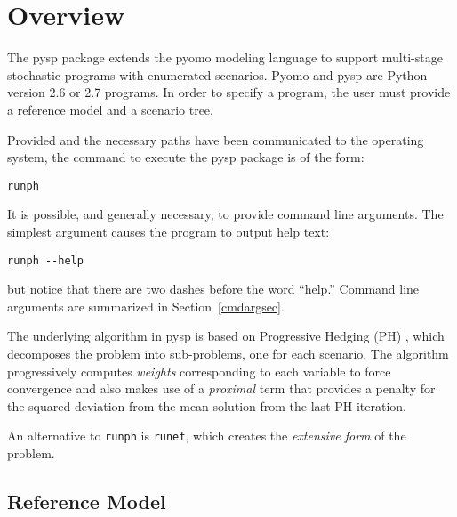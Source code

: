 \def\Argmax{\mathop{\rm argmax}}
\newcommand{\xBar}{\Vector{\overline{x}}}
\newcommand{\Bar}[1]{\overline{#1}}
\newcommand{\Prl}{\mbox{Pr}(\ell)}

\newcommand{\Vector}[1]{\mbox{{\boldmath $#1$}}}
\newcommand{\Matrix}[1]{\mbox{{\boldmath $#1$}}}
\newcommand{\VectLen}[1]{\mid\Vector{#1}\mid}
\newcommand{\Rint}[1]{\int_{#1}^{\infty}}
\newcommand{\Size}[1]{\mid #1 \mid}
\newcommand{\Floor}[1]{\lfloor #1 \rfloor}
\newcommand{\Ceil}[1]{\left\lceil #1 \right\rceil}

\section{Overview}

The pysp package extends the pyomo modeling language to support multi-stage
stochastic programs with enumerated scenarios. Pyomo and pysp are Python version
2.6 or 2.7 programs. In order to specify a program, the user must provide a reference
model and a scenario tree.

Provided and the necessary paths have been communicated to the operating system,
the command to execute the pysp package is of the form:

\begin{verbatim}
runph
\end{verbatim}

It is possible, and generally necessary, to provide command line arguments. The
simplest argument causes the program to output help text:

\begin{verbatim}
runph --help
\end{verbatim}

but notice that there are two dashes before the word ``help.'' Command line
arguments are summarized in Section~\ref{cmdargsec}.

The underlying algorithm in pysp is based on Progressive Hedging (PH)
\cite{RockafellarWets}, which decomposes the problem into sub-problems, one for
each scenario. The algorithm progressively computes {\em weights} corresponding
to each variable to force convergence and also makes use of a {\em proximal}
term that provides a penalty for the squared deviation from the mean solution
from the last PH iteration.

An alternative to \verb|runph| is \verb|runef|, which creates the 
{\em extensive form} of the problem.

\subsection{Reference Model}

